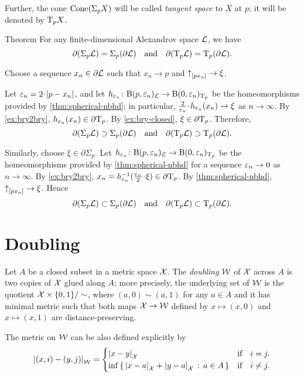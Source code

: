 Further, the cone $\mathop{\rm Cone}\nolimits(\Sigma_pX)$ will be called \emph{tangent space} to $X$ at $p$;
it will be denoted by $\mathrm{T}_pX$.

\begin{thm}{Theorem}\label{thm:partial-Sigma}
For any finite-dimensional Alexandrov space $\mathcal{L}$, we have
\[\partial (\Sigma_p\mathcal{L})=\Sigma_p(\partial\mathcal{L})
\quad\text{and}\quad
\partial(\mathrm{T}_p\mathcal{L})=\mathrm{T}_p(\partial\mathcal{L}).\]
\end{thm}

Choose a sequence $x_n\in \partial \mathcal{L}$ such that $x_n\to p$ and ${\uparrow}_{[{p}{x_n}]}\to\xi$.

Let $\eps_n=2\cdot \dist{p}{x_n}{}$,
and let $h_{\varepsilon_n}\colon\mathrm{B}{}(p,\varepsilon_n)_{\mathcal{L}}\to \mathrm{B}{}(0,\varepsilon_n)_{\mathrm{T}_p}$ be the homeomorphisms provided by \ref{thm:spherical-nbhd};
in particular, $\tfrac2{\eps_n}\cdot h_{\eps_n}(x_n)\to \xi$ as $n\to\infty$.
By \ref{ex:bry2bry}, $h_{\varepsilon_n}(x_n)\in \partial \mathrm{T}_p$.
By \ref{ex:bry-closed}, $\xi\in \partial \mathrm{T}_p$.
Therefore,
\[\partial (\Sigma_p\mathcal{L})\supset\Sigma_p(\partial\mathcal{L})
\quad\text{and}\quad
\partial(\mathrm{T}_p\mathcal{L})\supset\mathrm{T}_p(\partial\mathcal{L}).\]

Similarly, choose $\xi\in\partial\Sigma_p$.
Let $h_{\varepsilon_n}\colon\mathrm{B}{}(p,\varepsilon_n)_{\mathcal{L}}\to \mathrm{B}{}(0,\varepsilon_n)_{\mathrm{T}_p}$ be the homeomorphisms provided by \ref{thm:spherical-nbhd} for a sequence $\varepsilon_n\to 0$ as $n\to\infty$.
By \ref{ex:bry2bry}, $x_n=h_{\eps_n}^{-1}(\tfrac{\eps_n}2\cdot\xi)\in \partial \T_p$.
By \ref{thm:spherical-nbhd}, ${\uparrow}_{[{p}{x_n}]}\to \xi$.
Hence
\[\partial (\Sigma_p\mathcal{L})\subset\Sigma_p(\partial\mathcal{L})
\quad\text{and}\quad\partial(\mathrm{T}_p\mathcal{L})\subset\mathrm{T}_p(\partial\mathcal{L}).\]
\qedsf

\section{Doubling}

Let $A$ be a closed subset in a metric space $\mathcal{X}$.
The \emph{doubling} $\mathcal{W}$ of $\mathcal{X}$ across $A$ is two copies of $\mathcal{X}$ glued along $A$;
more precisely, the underlying set of $\mathcal{W}$ is the quotient $\mathcal{X}\times\{0,1\}/\sim$, where $(a,0)\sim (a,1)$ for any $a\in A$ and it has minimal metric such that both maps $\mathcal{X}\to \mathcal{W}$ defined by $x\mapsto (x,0)$ and $x\mapsto (x,1)$ are distance-preserving.

The metric on $\mathcal{W}$ can be also defined explicitly by
\[\dist{(x,i)}{(y,j)}{\spc{W}}=
\begin{cases}
\dist{x}{y}{\spc{X}}&\text{if}\quad i= j.
\\
\inf\set{\dist{x}{a}{\spc{X}}+\dist{y}{a}{\spc{X}}}{a\in A}&\text{if}\quad i\ne j.
\end{cases}
\]

